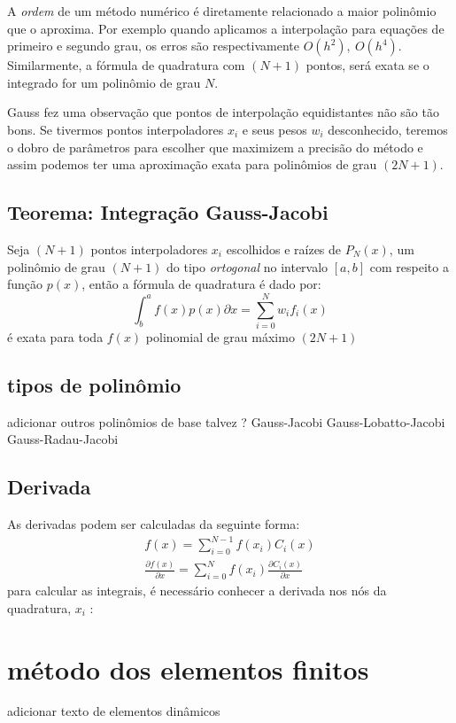  A \emph{ordem} de um método numérico é diretamente relacionado a maior polinômio que o aproxima. Por exemplo quando aplicamos a interpolação para equações de primeiro e segundo grau, os erros são respectivamente $O(h^2),\ O(h^4)$. Similarmente, a fórmula de quadratura com $(N + 1)$ pontos, será exata se o integrado for um polinômio de grau $N$.
 
 Gauss fez uma observação que pontos de interpolação equidistantes não são tão bons. Se tivermos pontos interpoladores $x_i$ e seus pesos $w_i$ 
desconhecido, teremos o dobro de parâmetros para escolher que maximizem a precisão do método e assim podemos ter uma aproximação exata para polinômios de grau $(2N + 1)$.
\subsection{Teorema: Integração Gauss-Jacobi}
 Seja $(N + 1)$ pontos interpoladores $x_i$ escolhidos e raízes de $P_N(x)$, um polinômio de grau $(N+1)$ do tipo \emph{ortogonal} no intervalo $[a,b]$ com respeito a função $p(x)$, então a fórmula de quadratura é dado por:
\begin{equation}
 \int^a_b f(x)p(x) \partial x = \sum^{N}_{i= 0} w_i f_i(x)
\end{equation} 
é exata para toda $f(x)$ polinomial de grau máximo $(2N +1)$

\subsection{tipos de polinômio}
	adicionar outros polinômios de base talvez ?
	Gauss-Jacobi
	Gauss-Lobatto-Jacobi
	Gauss-Radau-Jacobi 


\subsection{Derivada}
	As derivadas podem ser calculadas da seguinte forma:
	\begin{align}
	f(x) = \sum^{N-1}_{i=0} f(x_i) C_i(x)\\
	\frac{\partial f(x)}{\partial x} = \sum^{N}_{i = 0} f(x_i) \frac{\partial C_i(x)}{\partial x}
	\end{align}
	para calcular as integrais, é necessário conhecer a derivada nos nós da quadratura, $x_i$ :
	\begin{equation}
	
	\end{equation}

\section{método dos elementos finitos}
adicionar texto de elementos dinâmicos